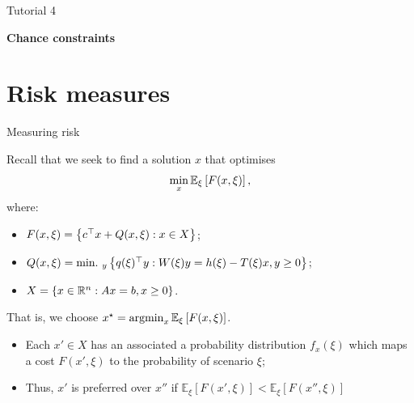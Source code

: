 \begin{frame}{Tutorial 4}

\centering
\large
\bf 
Chance constraints
	
\end{frame}


\section{Risk measures}


\begin{frame}{Measuring risk}

	Recall that we seek to find a solution $x$ that optimises
	\begin{equation*}
		\min_x	\mathbb{E}_\xi\left[ F(x, \xi) \right], 	
	\end{equation*}
	where: 
	\begin{itemize}
		\item $F(x,\xi) = \left\{ c^\top x + Q(x,\xi) : x \in X \right \}$;
		\item $Q(x, \xi) = \mathop{\text{min.} \ }_y \left\{ q(\xi)^\top y : W(\xi)y = h(\xi) - T(\xi)x, y \ge 0 \right \}$;
		\item $X=\left\{ x \in \mathbb R^n : Ax = b, x \ge 0 \right \}$.	
	\end{itemize}
	
	\pause
	That is, we choose $x^\star = \mathop{\rm argmin}_x \mathbb{E}_\xi\left[F(x,\xi)\right]	$.
	\begin{itemize}
		\item Each $x' \in X$ has an associated a \alert{probability distribution} $f_x(\xi)$ which maps a cost $F(x', \xi)$ to the probability of scenario $\xi$; 
		\item Thus, $x'$ is \alert{preferred} over $x''$ if 	$\mathbb{E}_\xi\left[F(x', \xi)\right] < \mathbb{E}_\xi\left[F(x'', \xi)\right]$
	\end{itemize}
	
\end{frame}



